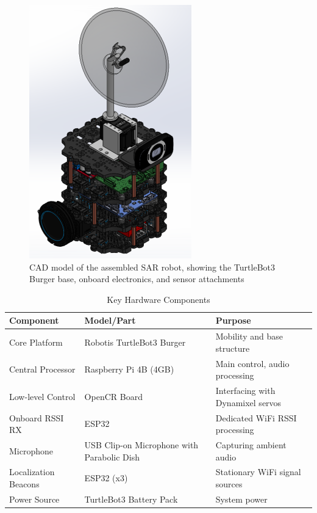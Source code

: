 \begin{figure}[!b]
  \centering
  \includegraphics[width=0.65\linewidth]{robotcad.png}
  \caption{CAD model of the assembled SAR robot, showing the TurtleBot3 Burger base, onboard electronics, and sensor attachments}
  \label{fig:robotCAD}
\end{figure}

\begin{table}[t]
  \caption{Key Hardware Components}
  \label{tab:hardware_components}
  \centering
  \begin{tabular}{lll}
    \toprule
    \textbf{Component} & \textbf{Model/Part} & \textbf{Purpose} \\
    \midrule
    Core Platform & Robotis TurtleBot3 Burger & Mobility and base structure \\
    Central Processor & Raspberry Pi 4B (4GB) & Main control, audio processing \\
    Low-level Control & OpenCR Board & Interfacing with Dynamixel servos \\
    Onboard RSSI RX & ESP32 & Dedicated WiFi RSSI processing \\
    Microphone & USB Clip-on Microphone with Parabolic Dish & Capturing ambient audio \\
    Localization Beacons & ESP32 (x3) & Stationary WiFi signal sources \\
    Power Source & TurtleBot3 Battery Pack & System power \\
    \bottomrule
  \end{tabular}
\end{table}

